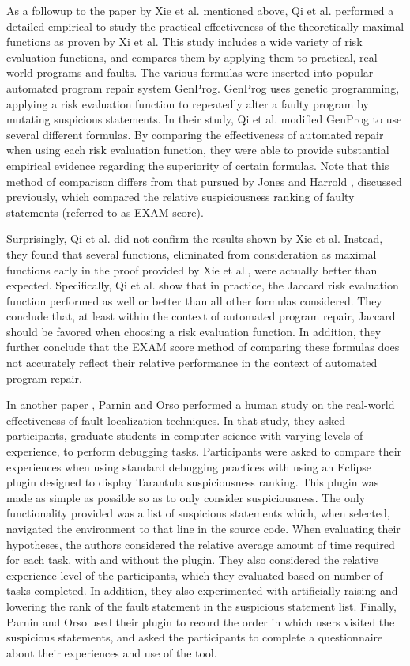 As a followup to the paper by Xie et al. mentioned above, Qi et al. \hspace*{-0.7mm}\cite{genprog}
performed a detailed empirical to study the practical effectiveness of the 
theoretically maximal functions as proven by Xi et al.  This study includes
a wide variety of risk evaluation functions, and compares them by applying 
them to practical, real-world programs and faults.  The various formulas
were inserted into popular automated program repair system GenProg.
GenProg uses genetic programming, applying a risk evaluation function to 
repeatedly alter a faulty program by mutating suspicious statements.  In their
study, Qi et al. \hspace*{-0.5mm}modified GenProg to use several different formulas.  By 
comparing the effectiveness of automated repair when using each 
risk evaluation function, they were able to provide substantial empirical
evidence regarding the superiority of certain formulas.  Note that this method
of comparison differs from that pursued by Jones and Harrold \cite{harrold}, 
discussed previously, which compared the relative suspiciousness ranking of 
faulty statements (referred to as EXAM score).

Surprisingly, Qi et al. did not confirm the results shown by Xie et al.
Instead, they found that several functions, eliminated from consideration
as maximal functions early in the proof provided by Xie et al., were actually 
better than expected. Specifically,
Qi et al. show that in practice, the Jaccard risk evaluation function performed
as well or better than all other formulas considered.  They conclude that,
at least within the context of automated program repair, Jaccard should be 
favored when choosing a risk evaluation function.  In addition, they further 
conclude that the EXAM score method of comparing these formulas does not 
accurately reflect their relative performance in the context of automated
program repair.

In another paper \cite{parnin}, Parnin and Orso performed a human study on the
real-world effectiveness of fault localization techniques.  In that
study, they asked participants, graduate students in computer science
with varying levels of experience, to perform debugging tasks.
Participants were asked to compare their experiences when using standard
debugging practices with using an Eclipse plugin designed to display
Tarantula suspiciousness ranking.  This plugin was made as simple as possible
so as to only consider suspiciousness.  The only functionality provided was a list of suspicious statements
which, when selected, navigated the environment to that line in the source
code.  When evaluating their hypotheses, the authors considered the
relative average amount of time required for each task, with and without
the plugin.  They also considered the relative experience level of the 
participants, which they evaluated based on number of tasks completed.  In 
addition, they also experimented with artificially raising and lowering
the rank of the fault statement in the suspicious statement list.  Finally,
Parnin and Orso used their plugin to record the order in which users
visited the suspicious statements, and asked the participants to complete
a questionnaire about their experiences and use of the tool.

